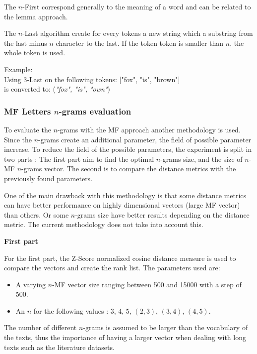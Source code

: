 The $n$-First correspond generally to the meaning of a word and can be related to the lemma approach.

\begin{definition}[$n$-Last]
  \label{def:n_last}
  The $n$-Last algorithm create for every tokens a new string which a substring from the last minus $n$ character to the last.
  If the token token is smaller than $n$, the whole token is used.

  Example: \\
  Using $3$-Last on the following tokens: ["fox", "is", "brown"] \\
  is converted to: (\textit{"fox", "is", "own"})
\end{definition}

\subsubsection{MF Letters $n$-grams evaluation}

To evaluate the $n$-grams with the MF approach another methodology is used.
Since the $n$-grams create an additional parameter, the field of possible parameter increase.
To reduce the field of the possible parameters, the experiment is split in two parts :
The first part aim to find the optimal $n$-grams size, and the size of $n$-MF $n$-grams vector.
The second is to compare the distance metrics with the previously found parameters.

One of the main drawback with this methodology is that some distance metrics can have better performance on highly dimensional vectors (large MF vector) than others.
Or some $n$-grams size have better results depending on the distance metric.
The current methodology does not take into account this.

\textbf{First part}

For the first part, the Z-Score normalized cosine distance measure is used to compare the vectors and create the rank list.
The parameters used are:

\begin{itemize}
  \item
  A varying $n$-MF vector size ranging between 500 and 15000 with a step of 500.
  \item
  An $n$ for the following values : $3$, $4$, $5$, $(2, 3)$, $(3, 4)$, $(4, 5)$.
\end{itemize}

The number of different $n$-grams is assumed to be larger than the vocabulary of the texts, thus the importance of having a larger vector when dealing with long texts such as the literature datasets.

